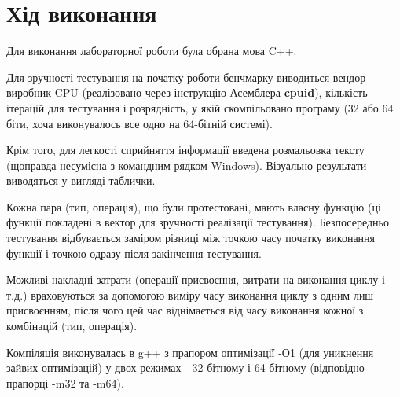\section{Хід виконання}

Для виконання лабораторної роботи була обрана мова C++. 

Для зручності тестування на початку роботи бенчмарку виводиться вендор-виробник CPU (реалізовано через інструкцію Асемблера \textbf{cpuid}), кількість ітерацій для тестування і розрядність, у якій скомпільовано програму (32 або 64 біти, хоча виконувалось все одно на 64-бітній системі).

Крім того, для легкості сприйняття інформації введена розмальовка тексту (щоправда несумісна з командним рядком Windows). Візуально результати виводяться у вигляді таблички.

Кожна пара (тип, операція), що були протестовані, мають власну функцію (ці функції покладені в вектор для зручності реалізації тестування). Безпосередньо тестування відбувається заміром різниці між точкою часу початку виконання функції і точкою одразу після закінчення тестування. 

Можливі накладні затрати (операції присвоєння, витрати на виконання циклу і т.д.) враховуються за допомогою виміру часу виконання циклу з одним лиш присвоєнням, після чого цей час віднімається від часу виконання кожної з комбінацій (тип, операція).

Компіляція виконувалась в g++ з прапором оптимізації -О1 (для уникнення зайвих оптимізацій) у двох режимах - 32-бітному і 64-бітному (відповідно прапорці -m32 та -m64). 
 
